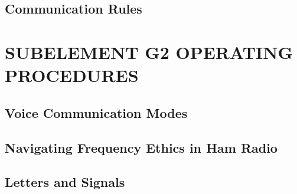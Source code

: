 \documentclass[12pt]{book}
\begin{document}
\section{Communication Rules}












\chapter{SUBELEMENT G2  OPERATING PROCEDURES}
\section{Voice Communication Modes}












\section{Navigating Frequency Ethics in Ham Radio}











\section{Letters and Signals}











\end{document}
